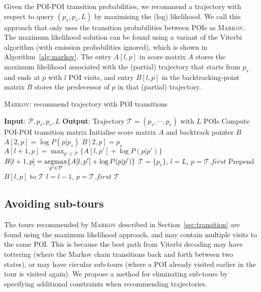 Given the POI-POI transition probabilities, we recommend a trajectory with respect to query
$(p_s, p_e, L)$ by maximising the (log) likelihood. We call this approach that only uses the
transition probabilities between POIs as \textsc{Markov}. The maximum likelihood solution
can be found using a variant of the Viterbi algorithm (with emission probabilities ignored),
which is shown in Algorithm~\ref{alg:markov}.
The entry $A[l, p]$ in score matrix $A$ stores the maximum likelihood associated with the (partial) trajectory 
that starts from $p_s$ and ends at $p$ with $l$ POI visits, 
and entry $B[l, p]$ in the backtracking-point matrix $B$ stores the predecessor of $p$ in that (partial) trajectory.

\begin{algorithm}[t]
\caption{\textsc{Markov}: recommend trajectory with POI transitions}
\label{alg:markov}
\begin{algorithmic}[1]
\STATE \textbf{Input}: $\mathcal{P}, p_s, p_e, L$
\STATE \textbf{Output}: Trajectory $\mathcal{T} = (p_s, \cdots, p_e)$ with $L$ POIs
\STATE Compute POI-POI transition matrix
\STATE Initialise score matrix $A$ and backtrack pointer $B$
    \STATE $A[2, p] = \log P(p|p_s)$
    \STATE $B[2, p] = p_s$
\ENDFOR
{}
        \STATE \(\displaystyle A[l+1, p] = \max_{p' \in \mathcal{P}} \{ A[l, p'] + \log P(p|p') \} \)
        \STATE \(\displaystyle B[l+1, p] = \operatorname*{argmax}_{p' \in \mathcal{P}} \{ A[l, p'] + \log P(p|p') \} \)
    \ENDFOR
\ENDFOR
\STATE $\mathcal{T} = \{p_e\}$, $l = L$, $p = \mathcal{T}.first$
\REPEAT
    \STATE Prepend $B[l, p]$ to $\mathcal{T}$
    \STATE $l = l - 1$, $p = \mathcal{T}.first$
\RETURN $\mathcal{T}$
\end{algorithmic}
\end{algorithm}


\subsection{Avoiding sub-tours} %
\label{sec:walkpath}

The tours recommended by \textsc{Markov} described in Section~\ref{sec:transition} are found
using the maximum likelihood approach, and may contain multiple visits to the same POI.
This is because the best path from Viterbi decoding %
may have tottering (where the Markov chain transitions back and forth between two states),
or may have circular sub-tours (where a POI already visited earlier in the tour is
visited again).
We propose a method for eliminating sub-tours by specifying additional constraints
when recommending trajectories.

